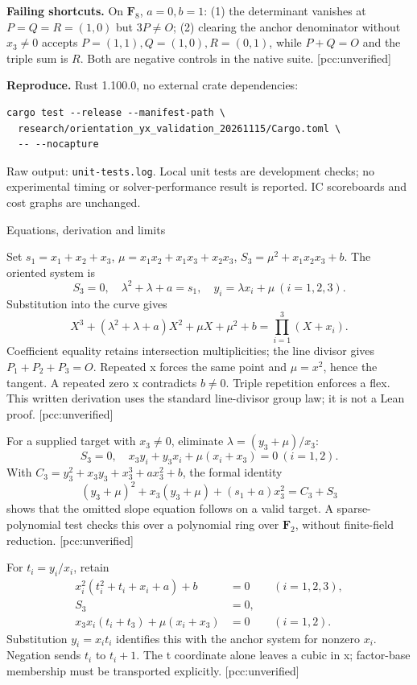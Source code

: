 \documentclass[10pt]{article}
\begin{document}
\textbf{Failing shortcuts.} On $\mathbf F_8$, $a=0,b=1$:
(1) the determinant vanishes at $P=Q=R=(1,0)$ but $3P\ne O$;
(2) clearing the anchor denominator without $x_3\ne0$ accepts
$P=(1,1),Q=(1,0),R=(0,1)$, while $P+Q=O$ and the triple sum is $R$.
Both are negative controls in the native suite. [pcc:unverified]

\textbf{Reproduce.} Rust 1.100.0, no external crate dependencies:
\begin{verbatim}
cargo test --release --manifest-path \
  research/orientation_yx_validation_20261115/Cargo.toml \
  -- --nocapture
\end{verbatim}
Raw output: \texttt{unit-tests.log}. Local unit tests are development checks; no experimental timing or solver-performance result is reported. IC scoreboards and cost graphs are unchanged.
\newpage
\begin{center}\Large Equations, derivation and limits\end{center}
Set $s_1=x_1+x_2+x_3$, $\mu=x_1x_2+x_1x_3+x_2x_3$,
$S_3=\mu^2+x_1x_2x_3+b$. The oriented system is
\[
S_3=0,\quad \lambda^2+\lambda+a=s_1,\quad y_i=\lambda x_i+\mu\ (i=1,2,3).
\]
Substitution into the curve gives
\[
X^3+(\lambda^2+\lambda+a)X^2+\mu X+\mu^2+b=\prod_{i=1}^3(X+x_i).
\]
Coefficient equality retains intersection multiplicities; the line divisor gives $P_1+P_2+P_3=O$. Repeated x forces the same point and $\mu=x^2$, hence the tangent. A repeated zero x contradicts $b\ne0$. Triple repetition enforces a flex. This written derivation uses the standard line-divisor group law; it is not a Lean proof. [pcc:unverified]

For a supplied target with $x_3\ne0$, eliminate $\lambda=(y_3+\mu)/x_3$:
\[
S_3=0,\quad x_3y_i+y_3x_i+\mu(x_i+x_3)=0\ (i=1,2).
\]
With $C_3=y_3^2+x_3y_3+x_3^3+ax_3^2+b$, the formal identity
\[
(y_3+\mu)^2+x_3(y_3+\mu)+(s_1+a)x_3^2=C_3+S_3
\]
shows that the omitted slope equation follows on a valid target. A sparse-polynomial test checks this over a polynomial ring over $\mathbf F_2$, without finite-field reduction. [pcc:unverified]

For $t_i=y_i/x_i$, retain
\begin{align*}
x_i^2(t_i^2+t_i+x_i+a)+b&=0 &&(i=1,2,3),\\
S_3&=0,\\
x_3x_i(t_i+t_3)+\mu(x_i+x_3)&=0 &&(i=1,2).
\end{align*}
Substitution $y_i=x_it_i$ identifies this with the anchor system for nonzero $x_i$. Negation sends $t_i$ to $t_i+1$. The t coordinate alone leaves a cubic in x; factor-base membership must be transported explicitly. [pcc:unverified]
\end{document}
